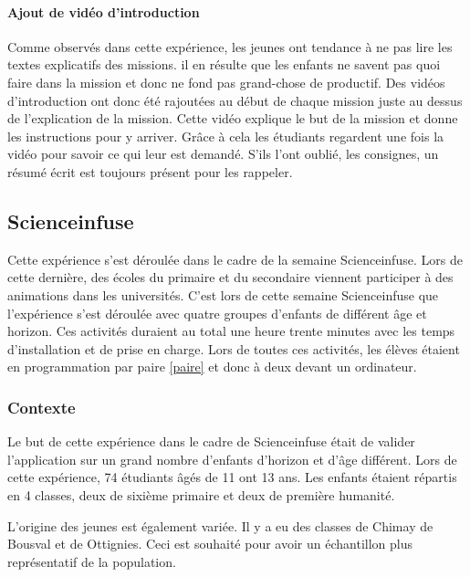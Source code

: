 \paragraph{Ajout de vidéo d'introduction}
Comme observés dans cette expérience, les jeunes ont tendance à ne pas lire les textes explicatifs des missions. il en  résulte que les enfants ne savent pas quoi faire dans la mission et donc ne fond pas grand-chose de productif. Des vidéos d'introduction ont donc été rajoutées au début de chaque mission juste au dessus de l'explication de la mission. Cette vidéo explique le but de la mission et donne les instructions pour y arriver. Grâce à cela les étudiants regardent une fois la vidéo pour savoir ce qui leur est demandé. S'ils l'ont oublié, les consignes, un résumé écrit est toujours présent pour les rappeler.


\subsection{Scienceinfuse}
Cette expérience s'est déroulée dans le cadre de la semaine Scienceinfuse. Lors de cette dernière, des écoles du primaire et du secondaire viennent participer à des animations dans les universités. C'est lors de cette semaine Scienceinfuse que l'expérience s'est déroulée avec quatre groupes d'enfants de différent âge et horizon. Ces activités duraient au total une heure trente minutes avec les temps d'installation et de prise en charge. Lors de toutes ces activités, les élèves étaient en programmation par paire \ref{paire} et donc à deux devant un ordinateur. %

\subsubsection{Contexte}
Le but de cette expérience dans le cadre de Scienceinfuse était de valider l'application sur un grand nombre d'enfants d'horizon et d'âge différent. Lors de cette expérience, 74 étudiants âgés de 11 ont 13 ans. Les enfants étaient répartis en 4 classes, deux de sixième primaire et deux de première humanité.

L'origine des jeunes est également variée. Il y a eu des classes de Chimay de Bousval et de Ottignies. Ceci est souhaité pour avoir un échantillon plus représentatif de la population.

